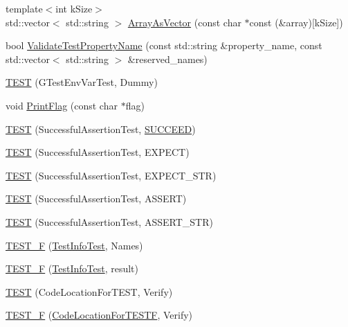 \begin{DoxyCompactItemize}
\item 
{\footnotesize template$<$int k\+Size$>$ }\\std\+::vector$<$ std\+::string $>$ \hyperlink{namespacetesting_a956d4c522454fa6dfd75b5bbbefe8f9e}{Array\+As\+Vector} (const char $\ast$const (\&array)\mbox{[}k\+Size\mbox{]})
\item 
bool \hyperlink{namespacetesting_a4c9bd414747bf0563bfdb32a2307dcdf}{Validate\+Test\+Property\+Name} (const std\+::string \&property\+\_\+name, const std\+::vector$<$ std\+::string $>$ \&reserved\+\_\+names)
\item 
\hyperlink{namespacetesting_af4187d1b48a2812f1335721ed8f30a99}{T\+E\+ST} (G\+Test\+Env\+Var\+Test, Dummy)
\item 
void \hyperlink{namespacetesting_a9863402455bfcf9be5fc0b1453a6d97d}{Print\+Flag} (const char $\ast$flag)
\item 
\hyperlink{namespacetesting_ae0cbea692840c88ab0b03285eb69ac97}{T\+E\+ST} (Successful\+Assertion\+Test, \hyperlink{gtest_8h_a75adcdf89f69b0b615e395daafc315af}{S\+U\+C\+C\+E\+ED})
\item 
\hyperlink{namespacetesting_af6c8f998f934372e5687d3998068e5e4}{T\+E\+ST} (Successful\+Assertion\+Test, E\+X\+P\+E\+CT)
\item 
\hyperlink{namespacetesting_a9b1e4b53f277d25e6d6413a0004481bb}{T\+E\+ST} (Successful\+Assertion\+Test, E\+X\+P\+E\+C\+T\+\_\+\+S\+TR)
\item 
\hyperlink{namespacetesting_afbe4c8233faff6eba04902b3cb041632}{T\+E\+ST} (Successful\+Assertion\+Test, A\+S\+S\+E\+RT)
\item 
\hyperlink{namespacetesting_a83dfac108c207258287b9f7aa9171e8a}{T\+E\+ST} (Successful\+Assertion\+Test, A\+S\+S\+E\+R\+T\+\_\+\+S\+TR)
\item 
\hyperlink{namespacetesting_acd53db89097aba1468724d6446069b1e}{T\+E\+S\+T\+\_\+F} (\hyperlink{classtesting_1_1_test_info_test}{Test\+Info\+Test}, Names)
\item 
\hyperlink{namespacetesting_ab00e29c00b3e29cdfa21d23b79dd3776}{T\+E\+S\+T\+\_\+F} (\hyperlink{classtesting_1_1_test_info_test}{Test\+Info\+Test}, result)
\item 
\hyperlink{namespacetesting_af597d0ad4de0197141b78e9c1035e491}{T\+E\+ST} (Code\+Location\+For\+T\+E\+ST, Verify)
\item 
\hyperlink{namespacetesting_a782ec43081903a0aaa6d009218eba2a8}{T\+E\+S\+T\+\_\+F} (\hyperlink{classtesting_1_1_code_location_for_t_e_s_t_f}{Code\+Location\+For\+T\+E\+S\+TF}, Verify)
\item 

\end{DoxyCompactItemize}

